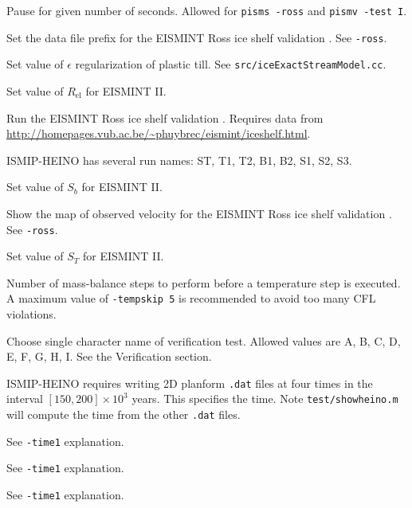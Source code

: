 \documentclass[11pt,final]{amsart}
\renewcommand{\t}[1]{\texttt{#1}}
\newcommand{\eps}{\epsilon}
\begin{document}
    Pause for given number of seconds.  Allowed for \verb|pisms -ross| and \verb|pismv -test I|.

    Set the data file prefix for the EISMINT Ross ice shelf validation \cite{MacAyealetal}.  See \verb|-ross|.

    Set value of $\eps$ regularization of plastic till.  See \t{src/iceExactStreamModel.cc}.



    Set value of $R_{\text{el}}$ for EISMINT II.

    Run the EISMINT Ross ice shelf validation \cite{MacAyealetal}.  Requires data from \url{http://homepages.vub.ac.be/~phuybrec/eismint/iceshelf.html}.

  ISMIP-HEINO has several run names: ST, T1, T2, B1, B2, S1, S2, S3.

    Set value of $S_b$ for EISMINT II.

    Show the map of observed velocity for the EISMINT Ross ice shelf validation \cite{MacAyealetal}.  See \verb|-ross|.

    Set value of $S_T$ for EISMINT II.

  Number of mass-balance steps to perform before a temperature step is executed.  A maximum value of \verb|-tempskip 5| is recommended to avoid too many CFL violations.

  Choose single character name of verification test.  Allowed values are A, B, C, D, E, F, G, H, I.  See the Verification section.

  ISMIP-HEINO requires writing 2D planform \verb|.dat| files at four times in the interval $[150,200]\times 10^{3}$ years.  This specifies the time.  Note \verb|test/showheino.m| will compute the time from the other \verb|.dat| files.

  See \verb|-time1| explanation.

  See \verb|-time1| explanation.

  See \verb|-time1| explanation.
\end{document}
